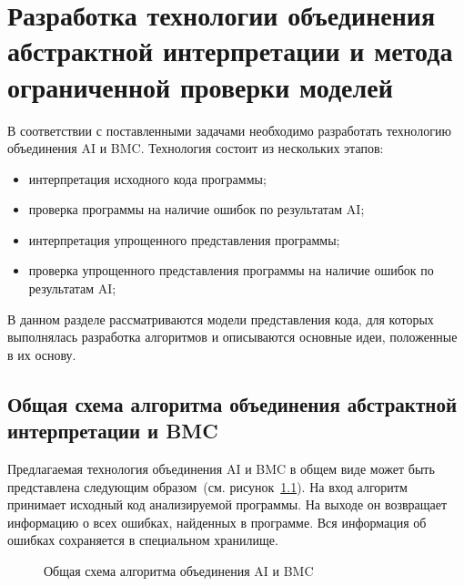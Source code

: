 \chapter{Разработка технологии объединения абстрактной интерпретации 
и метода ограниченной проверки моделей}
\label{chapter:algorithm}
В соответствии с поставленными задачами необходимо разработать технологию
объединения AI и BMC. Технология состоит из нескольких этапов:
\begin{itemize}
\item интерпретация исходного кода программы;
\item проверка программы на наличие ошибок по результатам AI;
\item интерпретация упрощенного представления программы;
\item проверка упрощенного представления программы на наличие ошибок по 
результатам AI;
\end{itemize}

В данном разделе рассматриваются модели представления кода, для которых 
выполнялась разработка алгоритмов и описываются основные идеи, положенные в их
основу.

\section{Общая схема алгоритма объединения абстрактной интерпретации и BMC}
Предлагаемая технология объединения AI и BMC в общем виде может быть 
представлена следующим образом~(см. рисунок~\ref{image:algorithmOverview}). На
вход алгоритм принимает исходный код анализируемой программы. На выходе он 
возвращает информацию о всех ошибках, найденных в программе. Вся информация
об ошибках сохраняется в специальном хранилище.

\begin{figure}[h!]
\caption{Общая схема алгоритма объединения AI и BMC}
\label{image:algorithmOverview}
\end{figure}

